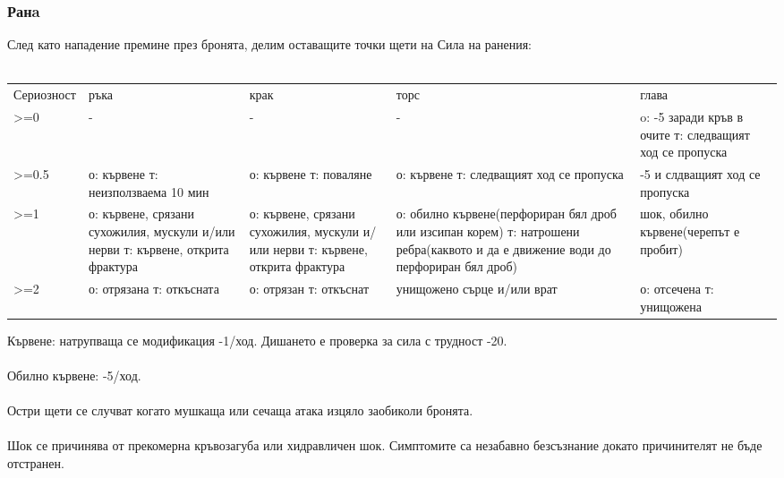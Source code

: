 \subsubsection{Ранa}
След като нападение премине през бронята, делим оставащите точки щети на Сила на ранения:
\\
\\
\begin{tabular}{ p{3cm} | p{3cm} | p{3cm} | p{3cm} | p{3cm} }
Сериозност & ръка                                                                             & крак                                                                            & торс                                     & глава                                                   \\
>=0        & -                                                                                & -                                                                               & -                                        & o: -5 заради кръв в очите т: следващият ход се пропуска \\
>=0.5      & о: кървене т: неизползваема 10 мин                                               & о: кървене т: поваляне                                                          & о: кървене т: следващият ход се пропуска & -5 и слдващият ход се пропуска     \\
>=1        & о: кървене, срязани сухожилия, мускули и/или нерви т: кървене, открита фрактура  & о: кървене, срязани сухожилия, мускули и/или нерви т: кървене, открита фрактура & о: обилно кървене(перфориран бял дроб или изсипан корем) т: натрошени ребра(каквото и да е движение води до перфориран бял дроб)                 & шок, обилно кървене(черепът е пробит) \\
>=2        & о: отрязана т: откъсната                                                         & о: отрязан т: откъснат                                                          & унищожено сърце и/или врат                                                       & о: отсечена т: унищожена \\
\end{tabular}

\noindent
Кървене: натрупваща се модификация -1/ход.
Дишането е проверка за сила с трудност -20.
\\
\\
Обилно кървене: -5/ход.
\\
\\
Остри щети се случват когато мушкаща или сечаща атака изцяло заобиколи бронята.
\\
\\
Шок се причинява от прекомерна кръвозагуба или хидравличен шок.
Симптомите са незабавно безсъзнание докато причинителят не бъде отстранен.


